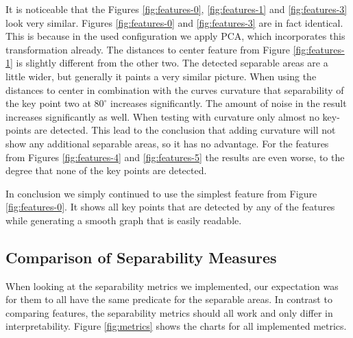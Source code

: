 \documentclass[pdftex,12pt,a4paper]{report}
\begin{document}
It is noticeable that the Figures \ref{fig:features-0}, \ref{fig:features-1} and \ref{fig:features-3} look very similar. Figures \ref{fig:features-0} and \ref{fig:features-3} are in fact identical. This is because in the used configuration we apply PCA, which incorporates this transformation already. The distances to center feature from Figure \ref{fig:features-1} is slightly different from the other two. The detected separable areas are a little wider, but generally it paints a very similar picture. When using the distances to center in combination with the curves curvature that separability of the key point two at $80^\circ$ increases significantly. The amount of noise in the result increases significantly as well. When testing with curvature only almost no key-points are detected. This lead to the conclusion that adding curvature will not show any additional separable areas, so it has no advantage. For the features from Figures \ref{fig:features-4} and \ref{fig:features-5} the results are even worse, to the degree that none of the key points are detected.

In conclusion we simply continued to use the simplest feature from Figure \ref{fig:features-0}. It shows all key points that are detected by any of the features while generating a smooth graph that is easily readable.

\subsection{Comparison of Separability Measures}

When looking at the separability metrics we implemented, our expectation was for them to all have the same predicate for the separable areas. In contrast to comparing features, the separability metrics should all work and only differ in interpretability. Figure \ref{fig:metrics} shows the charts for all implemented metrics.
\end{document}
